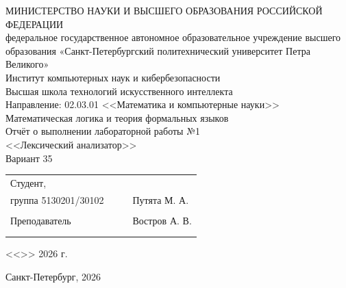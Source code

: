 \documentclass[a4paper,final]{article}
\begin{document}
\thispagestyle{empty}
\begin{center}
\hfill \break
\hfill \break
\normalsize{МИНИСТЕРСТВО НАУКИ И ВЫСШЕГО ОБРАЗОВАНИЯ РОССИЙСКОЙ ФЕДЕРАЦИИ\\
 федеральное государственное автономное образовательное учреждение высшего образования «Санкт-Петербургский политехнический университет Петра Великого»\\[10pt]}
\normalsize{Институт компьютерных наук и кибербезопасности}\\[10pt] 
\normalsize{Высшая школа технологий искусственного интеллекта}\\[10pt] 
\normalsize{Направление: 02.03.01 <<Математика и компьютерные науки>>}\\
\vspace{75pt}
{\large Математическая логика и теория формальных языков\\
Отчёт о выполнении лабораторной работы №1 \\
<<Лексический анализатор>>\\[1em]
Вариант 35}
\end{center}
 \vspace{80pt}
\small{ 
\begin{tabular}{lrrl}
\!\!\!Студент, & \hspace{2cm} & & \\
\!\!\!группа 5130201/30102 & \hspace{2cm} & \underline{\hspace{3cm}} & Путята М. А.  \\\\
\!\!\!Преподаватель & \hspace{2cm} & \underline{\hspace{3cm}} &  Востров А. В. \\\\
&&\hspace{5cm}
\end{tabular}
\begin{flushright}
<<\underline{\hspace{1cm}}>>\underline{\hspace{2.5cm}} 2026 г.
\end{flushright}
}

\hfill \break
\begin{center} \small{Санкт-Петербург, 2026} \end{center}


\newpage
\tableofcontents
\newpage
\end{document}
